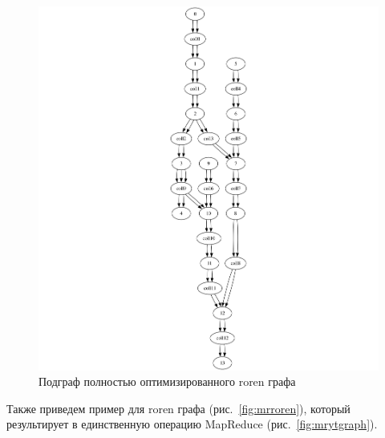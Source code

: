 \begin{figure}[h]
    \centering
    \includegraphics[width=\textwidth]{img/subgraph.png}
    \caption{Подграф полностью оптимизированного roren графа}
    \label{fig:subgraph}
\end{figure}

Также приведем пример для roren графа (рис.~\ref{fig:mrroren}), который результирует в единственную операцию MapReduce (рис.~\ref{fig:mrytgraph}).

